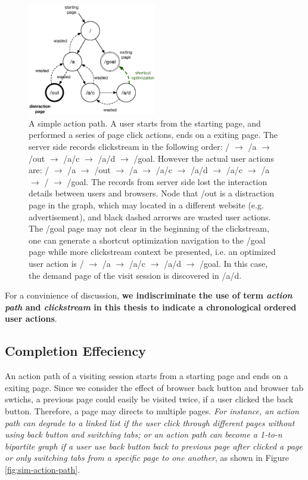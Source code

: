 \begin{figure}[H]
    \centering
    \includegraphics[width=0.5\textwidth]{figures/clickstream}
    \caption{A simple action path. A user starts from the starting page, and performed
    a series of page click actions, ends on a exiting page. 
    The server side records clickstream in the following order:
    / $\rightarrow$ /a $\rightarrow$ /out $\rightarrow$ /a/c $\rightarrow$ /a/d $\rightarrow$ /goal.
    However the actual user actions are: 
    / $\rightarrow$ /a $\rightarrow$ /out $\rightarrow$ /a $\rightarrow$ /a/c $\rightarrow$ /a/d 
    $\rightarrow$ /a/c $\rightarrow$ /a $\rightarrow$ / $\rightarrow$ /goal. 
    The records from server side lost the interaction details between users and browsers.
    Node that /out is a distraction page in the graph, 
    which may located in a different website (e.g. advertisement), 
    and black dashed arrorws are wasted user
    actions. The /goal page may not clear in the beginning of the clickstream, one can generate
    a shortcut optimization navigation to the /goal page while more clickstream context
    be presented, i.e. an optimized user action is 
    / $\rightarrow$ /a $\rightarrow$ /a/c $\rightarrow$ /a/d $\rightarrow$ /goal. In this case,
    the demand page of the visit session is discovered in /a/d.}
    \label{fig:clickstream}
\end{figure}

For a convinience of discussion, \textbf{we indiscriminate the use of 
term \emph{action path} and \emph{clickstream} in
this thesis to indicate a chronological ordered user actions}.

\subsection{Completion Effeciency}

An action path of a visiting session starts from a starting page and ends on a exiting page.
Since we consider the effect of browser back button and browser tab swtichs, 
a previous page could easily be visited twice, if a user clicked the back button. 
Therefore, a page may directs to multiple pages. 
\emph{For instance, an action path can degrade to a linked list if the user
click through different pages without using back button and switching tabs; or an action
path can become a 1-to-n bipartite graph if a user use back button back to previous page
after clicked a page or only switching tabs from a specific page to one another}, 
as shown in Figure \ref{fig:sim-action-path}.

